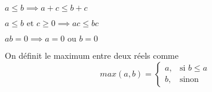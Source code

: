 \documentclass[a4paper, 12pt]{article}
\begin{document}
\begin{proprietes}
    \item $a \leq b \implies a + c \leq b + c$
    \item $a \leq b \text{ et } c \geq 0 \implies ac \leq bc$
    \item $ab = 0 \implies a = 0 \text{ ou } b = 0$
\end{proprietes}

On définit le maximum entre deux réels comme
\begin{equation*}
    max(a, b) =
    \begin{cases}
        a, & \text{si } b \leq a \\
        b, & \text{sinon}
    \end{cases}
\end{equation*}
\end{document}
